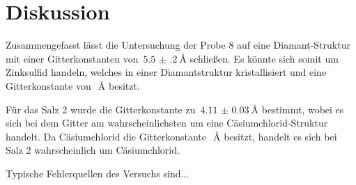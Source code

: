 \section{Diskussion}
\label{sec:diskussion}

Zusammengefasst lässt die Untersuchung der Probe 8 auf eine Diamant-Struktur
mit einer Gitterkonstanten von~$\SI{5.5(2)}{\angstrom}$ schließen. Es könnte
sich somit um Zinksulfid handeln, welches in einer Diamantstruktur
kristallisiert und eine Gitterkonstante von~$\SI{}{\angstrom}$ besitzt.

Für das Salz 2 wurde die Gitterkonstante zu~$\SI{4.11(3)}{\angstrom}$ bestimmt,
wobei es sich bei dem Gitter am wahrscheinlichsten um eine
Cäsiumchlorid-Struktur handelt. Da Cäsiumchlorid die
Gitterkonstante~$\SI{}{\angstrom}$ besitzt, handelt es sich bei Salz 2
wahrscheinlich um Cäsiumchlorid.

Typische Fehlerquellen des Versuchs sind...
